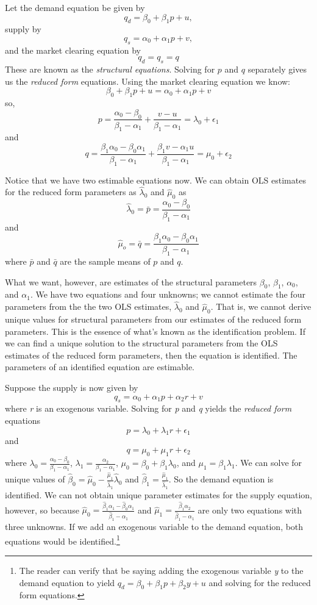 \documentclass[]{book}
\let\rmarkdownfootnote\footnote%
\def\footnote{\protect\rmarkdownfootnote}
\begin{document}
Let the demand equation be given by \[q_d=\beta_0+\beta_1p+u,\] supply by \[q_s=\alpha_0+\alpha_1p+v,\] and the market clearing equation by \[q_d=q_s=q\] These are known as the \emph{structural equations}. Solving for \(p\) and \(q\) separately gives us the \emph{reduced form} equations. Using the market clearing equation we know: \[\beta_0+\beta_1p+u=\alpha_0+\alpha_1p+v\] so, \[p=\frac{\alpha_0-\beta_0}{\beta_1-\alpha_1}+\frac{v-u}{\beta_1-\alpha_1}=\lambda_0+\epsilon_1\] and \[q=\frac{\beta_1\alpha_0-\beta_0\alpha_1}{\beta_1-\alpha_1}+\frac{\beta_1v-\alpha_1u}{\beta_1-\alpha_1}=\mu_0+\epsilon_2\]

Notice that we have two estimable equations now. We can obtain OLS estimates for the reduced form parameters as \(\hat\lambda_0\) and \(\hat\mu_0\) as \[\hat\lambda_0=\bar p = \frac{\alpha_0-\beta_0}{\beta_1-\alpha_1}\] and \[\hat\mu_o=\bar q=\frac{\beta_1\alpha_0-\beta_0\alpha_1}{\beta_1-\alpha_1}\] where \(\bar p\) and \(\bar q\) are the sample means of \(p\) and \(q\).

What we want, however, are estimates of the structural parameters \(\beta_0\), \(\beta_1\), \(\alpha_0\), and \(\alpha_1\). We have two equations and four unknowns; we cannot estimate the four parameters from the the two OLS estimates, \(\hat\lambda_0\) and \(\hat\mu_0\). That is, we cannot derive unique values for structural parameters from our estimates of the reduced form parameters. This is the essence of what's known as the identification problem. If we can find a unique solution to the structural parameters from the OLS estimates of the reduced form parameters, then the equation is identified. The parameters of an identified equation are estimable.

Suppose the supply is now given by \[q_s=\alpha_0+\alpha_1p+\alpha_2r+v\]
where \emph{r} is an exogenous variable. Solving for \emph{p} and \emph{q} yields the \emph{reduced form} equations \[p=\lambda_0+\lambda_1r+\epsilon_1\] and \[q=\mu_0+\mu_1r+\epsilon_2\] where \(\lambda_0=\frac{\alpha_0-\beta_0}{\beta_1-\alpha_1}\), \(\lambda_1=\frac{\alpha_2}{\beta_1-\alpha_1}\), \(\mu_0=\beta_0+\beta_1\lambda_0\), and \(\mu_1=\beta_1\lambda_1\). We can solve for unique values of \(\hat\beta_0=\hat\mu_0-\frac{\hat\mu_1}{\hat\lambda_1}\hat\lambda_0\) and \(\hat\beta_1=\frac{\hat\mu_1}{\hat\lambda_1}\). So the demand equation is identified. We can not obtain unique parameter estimates for the supply equation, however, so because \(\hat\mu_0=\frac{\hat\beta_1\alpha_1-\hat\beta_0\alpha_1}{\hat\beta_1-\alpha_1}\) and \(\hat\mu_1=\frac{\hat\beta_1\alpha_2}{\hat\beta_1-\alpha_1}\) are only two equations with three unknowns. If we add an exogenous variable to the demand equation, both equations would be identified.\footnote{The reader can verify that be saying adding the exogenous variable \emph{y} to the demand equation to yield \(q_d=\beta_0+\beta_1p+\beta_2y+u\) and solving for the reduced form equations.}
\end{document}
